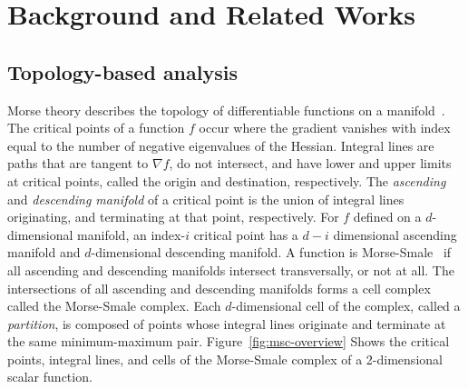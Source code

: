 \section{Background and Related Works}
\label{sec:bg}

\subsection{Topology-based analysis}
 Morse theory describes the topology of differentiable functions on a manifold~\cite{Milnor63}. The critical points of a function $f$ occur where the gradient vanishes with index equal to the number of negative eigenvalues of the Hessian. Integral lines are paths that are tangent to $\nabla f$, do not intersect, and have lower and upper limits at critical points, called the origin and destination, respectively. The \textit{ascending} and \textit{descending manifold} of a critical point is the union of integral lines originating, and terminating at that point, respectively. For $f$ defined on a $d$-dimensional manifold, an index-$i$ critical point has a $d-i$ dimensional ascending manifold and $d$-dimensional descending manifold. A function is Morse-Smale~\cite{Sma61a, Sma61b}  if all ascending and descending manifolds intersect transversally, or not at all. The intersections of all ascending and descending manifolds forms a cell complex called the Morse-Smale complex. Each $d$-dimensional cell of the complex, called a \textit{partition}, is composed of points whose integral lines originate and terminate at the same minimum-maximum pair. Figure~\ref{fig:msc-overview} Shows the critical points, integral lines, and cells of the Morse-Smale complex of a 2-dimensional scalar function. 

